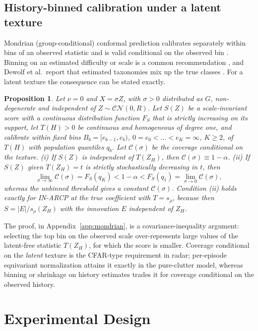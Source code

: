 \documentclass[journal]{IEEEtran}
\newtheorem{proposition}{Proposition}
\begin{document}
\subsection{History-binned calibration under a latent texture}
Mondrian (group-conditional) conformal prediction calibrates separately within bins of an observed statistic and is valid conditional on the observed bin \cite{vovk2012,bostrom2020}. Binning on an estimated difficulty or scale is a common recommendation \cite{bostrom2020}, and Dewolf et al.\ report that estimated taxonomies mix up the true classes \cite[\S5.2]{dewolf2025}. For a latent texture the consequence can be stated exactly.
\begin{proposition}\label{prop:mondrian}
Let $\nu=0$ and $X=\sigma Z$, with $\sigma>0$ distributed as $G$, non-degenerate and independent of $Z\sim\mathcal{CN}(0,R)$. Let $S(Z)$ be a scale-invariant score with a continuous distribution function $F_S$ that is strictly increasing on its support, let $T(H)>0$ be continuous and homogeneous of degree one, and calibrate within fixed bins $B_b=[e_{b-1},e_b)$, $0=e_0<\dots<e_K=\infty$, $K\ge2$, of $T(H)$ with population quantiles $q_b$. Let $\mathcal C(\sigma)$ be the coverage conditional on the texture.
(i) If $S(Z)$ is independent of $T(Z_H)$, then $\mathcal C(\sigma)\equiv1-\alpha$.
(ii) If $S(Z)$ given $T(Z_H)=t$ is strictly stochastically decreasing in $t$, then
\[
\lim_{\sigma\to\infty}\mathcal C(\sigma)=F_S(q_K)<1-\alpha<F_S(q_1)=\lim_{\sigma\to0}\mathcal C(\sigma),
\]
whereas the unbinned threshold gives a constant $\mathcal C(\sigma)$.
Condition (ii) holds exactly for IN-ARCP at the true coefficient with $T=s_\rho$, because then $S=|E|/s_\rho(Z_H)$ with the innovation $E$ independent of $Z_H$.
\end{proposition}
The proof, in Appendix~\ref{app:mondrian}, is a covariance-inequality argument: selecting the top bin on the observed scale over-represents large values of the latent-free statistic $T(Z_H)$, for which the score is smaller. Coverage conditional on the \emph{latent} texture is the CFAR-type requirement in radar; per-episode equivariant normalization attains it exactly in the pure-clutter model, whereas binning or shrinkage on history estimates trades it for coverage conditional on the observed history.

\section{Experimental Design}
\end{document}

